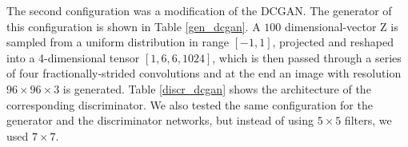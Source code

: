 \documentclass[a4paper, 10pt, conference]{ieeeconf}      %
\begin{document}
\begin{table}[h]
\centering
\caption{Configuration 1: Discriminator network of our semi-supervised GAN; input is a $32 \times 32 \times 3$ image}
\label{disc_ssgan}
\end{table}

The second configuration was a modification of the DCGAN. The generator of this configuration is shown in Table \ref{gen_dcgan}. A $100$ dimensional-vector Z is sampled from a uniform distribution in range $[-1,1]$, projected and reshaped into a 4-dimensional tensor $[1, 6, 6, 1024]$, which is then passed through a series of four fractionally-strided convolutions and at the end an image with resolution $96 \times 96 \times 3$ is generated. Table \ref{discr_dcgan} shows the architecture of the corresponding discriminator. We also tested the same configuration for the generator and the discriminator networks, but instead of using $5 \times 5$ filters, we used $7 \times 7$.
\end{document}
